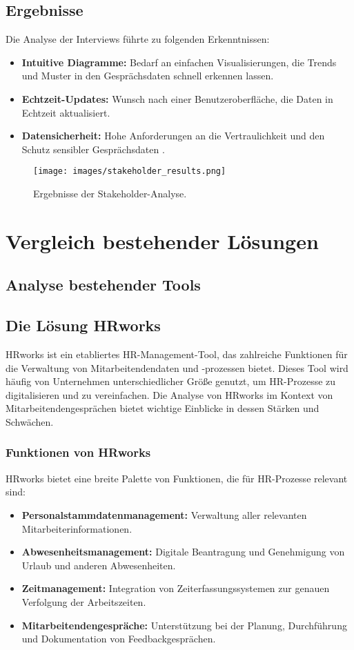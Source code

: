 \subsection{Ergebnisse}
Die Analyse der Interviews führte zu folgenden Erkenntnissen:
\begin{itemize}
    \item \textbf{Intuitive Diagramme:} Bedarf an einfachen Visualisierungen, die Trends und Muster in den Gesprächsdaten schnell erkennen lassen.
    \item \textbf{Echtzeit-Updates:} Wunsch nach einer Benutzeroberfläche, die Daten in Echtzeit aktualisiert.
    \item \textbf{Datensicherheit:} Hohe Anforderungen an die Vertraulichkeit und den Schutz sensibler Gesprächsdaten \cite{bryson2011employee}.
\end{itemize}

\begin{figure}[h!]
    \centering
    \texttt{[image: images/stakeholder\_results.png]}
    \caption{Ergebnisse der Stakeholder-Analyse.}
    \label{fig:stakeholder_results}
\end{figure}

\section{Vergleich bestehender Lösungen}
\subsection{Analyse bestehender Tools}
\subsection{Die Lösung HRworks}
HRworks ist ein etabliertes HR-Management-Tool, das zahlreiche Funktionen für die Verwaltung von Mitarbeitendendaten und -prozessen bietet. Dieses Tool wird häufig von Unternehmen unterschiedlicher Größe genutzt, um HR-Prozesse zu digitalisieren und zu vereinfachen. Die Analyse von HRworks im Kontext von Mitarbeitendengesprächen bietet wichtige Einblicke in dessen Stärken und Schwächen.

\subsubsection{Funktionen von HRworks}
HRworks bietet eine breite Palette von Funktionen, die für HR-Prozesse relevant sind:
\begin{itemize}
    \item \textbf{Personalstammdatenmanagement:} Verwaltung aller relevanten Mitarbeiterinformationen.
    \item \textbf{Abwesenheitsmanagement:} Digitale Beantragung und Genehmigung von Urlaub und anderen Abwesenheiten.
    \item \textbf{Zeitmanagement:} Integration von Zeiterfassungssystemen zur genauen Verfolgung der Arbeitszeiten.
    \item \textbf{Mitarbeitendengespräche:} Unterstützung bei der Planung, Durchführung und Dokumentation von Feedbackgesprächen.
\end{itemize}

